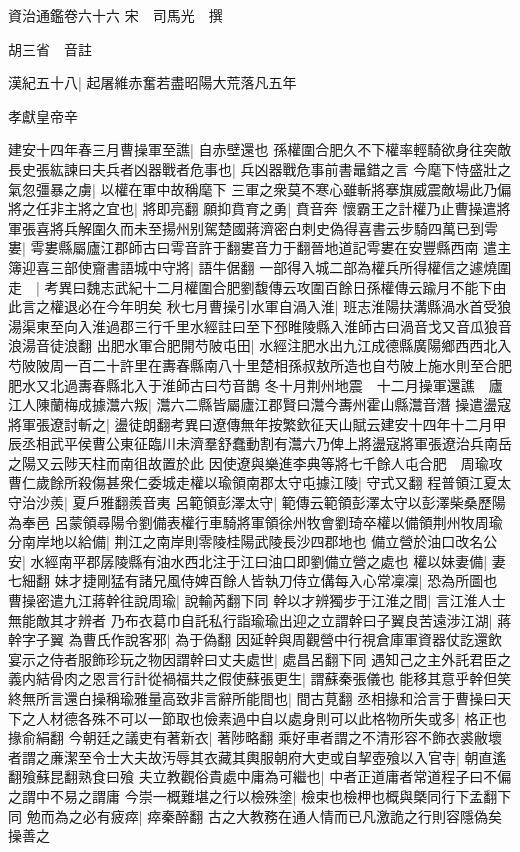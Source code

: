 資治通鑑卷六十六
宋　司馬光　撰

胡三省　音註

漢紀五十八|{
	起屠維赤奮若盡昭陽大荒落凡五年}


孝獻皇帝辛

建安十四年春三月曹操軍至譙|{
	自赤壁還也}
孫權圍合肥久不下權率輕騎欲身往突敵長史張紘諫曰夫兵者凶器戰者危事也|{
	兵凶器戰危事前書鼂錯之言}
今麾下恃盛壯之氣忽彊暴之虜|{
	以權在軍中故稱麾下}
三軍之衆莫不寒心雖斬將搴旗威震敵場此乃偏將之任非主將之宜也|{
	將即亮翻}
願抑賁育之勇|{
	賁音奔}
懷霸王之計權乃止曹操遣將軍張喜將兵解圍久而未至揚州别駕楚國蔣濟密白刺史偽得喜書云步騎四萬已到雩婁|{
	雩婁縣屬廬江郡師古曰雩音許于翻婁音力于翻晉地道記雩婁在安豐縣西南}
遣主簿迎喜三部使齎書語城中守將|{
	語牛倨翻}
一部得入城二部為權兵所得權信之遽燒圍走　|{
	考異曰魏志武紀十二月權圍合肥劉馥傳云攻圍百餘日孫權傳云踰月不能下由此言之權退必在今年明矣}
秋七月曹操引水軍自渦入淮|{
	班志淮陽扶溝縣渦水首受狼湯渠東至向入淮過郡三行千里水經註曰至下邳睢陵縣入淮師古曰渦音戈又音瓜狼音浪湯音徒浪翻}
出肥水軍合肥開芍陂屯田|{
	水經注肥水出九江成德縣廣陽鄉西西北入芍陂陂周一百二十許里在夀春縣南八十里楚相孫叔敖所造也自芍陂上施水則至合肥肥水又北過夀春縣北入于淮師古曰芍音鵲}
冬十月荆州地震　十二月操軍還譙　廬江人陳蘭梅成據灊六叛|{
	灊六二縣皆屬廬江郡賢曰灊今夀州霍山縣灊音潛}
操遣盪寇將軍張遼討斬之|{
	盪徒朗翻考異曰遼傳無年按繁欽征天山賦云建安十四年十二月甲辰丞相武平侯曹公東征臨川未濟羣舒蠢動割有灊六乃俾上將盪寇將軍張遼治兵南岳之陽又云陟天柱而南徂故置於此}
因使遼與樂進李典等將七千餘人屯合肥　周瑜攻曹仁歲餘所殺傷甚衆仁委城走權以瑜領南郡太守屯據江陵|{
	守式又翻}
程普領江夏太守治沙羨|{
	夏戶雅翻羨音夷}
呂範領彭澤太守|{
	範傳云範領彭澤太守以彭澤柴桑歷陽為奉邑}
呂蒙領尋陽令劉備表權行車騎將軍領徐州牧會劉琦卒權以備領荆州牧周瑜分南岸地以給備|{
	荆江之南岸則零陵桂陽武陵長沙四郡地也}
備立營於油口改名公安|{
	水經南平郡孱陵縣有油水西北注于江曰油口即劉備立營之處也}
權以妹妻備|{
	妻七細翻}
妹才捷剛猛有諸兄風侍婢百餘人皆執刀侍立傋每入心常凜凜|{
	恐為所圖也}
曹操密遣九江蔣幹往說周瑜|{
	說輸芮翻下同}
幹以才辨獨步于江淮之間|{
	言江淮人士無能敵其才辨者}
乃布衣葛巾自託私行詣瑜瑜出迎之立謂幹曰子翼良苦遠涉江湖|{
	蔣幹字子翼}
為曹氏作說客邪|{
	為于偽翻}
因延幹與周觀營中行視倉庫軍資器仗訖還飲宴示之侍者服飾珍玩之物因謂幹曰丈夫處世|{
	處昌呂翻下同}
遇知己之主外託君臣之義内結骨肉之恩言行計從禍福共之假使蘇張更生|{
	謂蘇秦張儀也}
能移其意乎幹但笑終無所言還白操稱瑜雅量高致非言辭所能間也|{
	間古莧翻}
丞相掾和洽言于曹操曰天下之人材德各殊不可以一節取也儉素過中自以處身則可以此格物所失或多|{
	格正也掾俞絹翻}
今朝廷之議吏有著新衣|{
	著陟略翻}
乘好車者謂之不清形容不飾衣裘敝壞者謂之亷潔至令士大夫故汚辱其衣藏其輿服朝府大吏或自挈壺飱以入官寺|{
	朝直遙翻飱蘇昆翻熟食曰飱}
夫立教觀俗貴處中庸為可繼也|{
	中者正道庸者常道程子曰不偏之謂中不易之謂庸}
今崇一概難堪之行以檢殊塗|{
	檢束也檢柙也概與槩同行下孟翻下同}
勉而為之必有疲瘁|{
	瘁秦醉翻}
古之大教務在通人情而已凡激詭之行則容隱偽矣操善之


